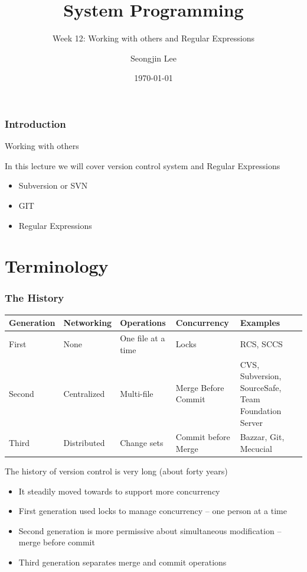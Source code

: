 \documentclass[newPxFont,sthlmFooter,nooffset]{beamer}
\title{System Programming}
\subtitle{Week 12: Working with others and Regular Expressions}
\author[SJL]{Seongjin Lee}
\institute{\href{mailto:insight@gnu.ac.kr}{insight@gnu.ac.kr}\\\url{http://open.gnu.ac.kr}\\Systems Research Lab.\\Gyeongsang National University}
\date{\today}
\begin{document}
\frame[plain]{\titlepage} 






\begin{frame}[t]
  \frametitle{Introduction}

Working with others 

In this lecture we will cover version control system and Regular Expressions
\begin{itemize}
\item Subversion or SVN
\item GIT
\item Regular Expressions
\end{itemize}
\end{frame}

\section{Terminology}

\begin{frame}[t]
  \frametitle{The History}
{\footnotesize
  \begin{table}[h]
    \centering
    \begin{tabular}{l | l | m{2cm} | m{2cm} | m{3cm}}
      Generation & Networking & Operations & Concurrency & Examples \\ \hline \hline
First & None & One file at a time & Locks & RCS, SCCS \\ \hline
Second & Centralized & Multi-file & Merge Before Commit & CVS, Subversion, SourceSafe, Team Foundation Server \\ \hline
Third & Distributed & Change sets & Commit before Merge & Bazzar, Git, Mecucial
    \end{tabular}
  \end{table}
}

The history of version control is very long (about forty years)
\begin{itemize}
\item It steadily moved towards to support more concurrency
\item First generation used locks to manage concurrency – one person at a time
\item Second generation is more permissive about simultaneous modification – merge before commit
\item Third generation separates merge and commit operations
\end{itemize}
\end{frame}
\end{document}
